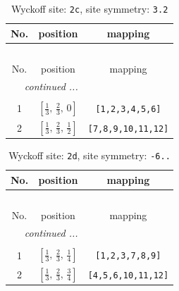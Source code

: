 \documentclass[fleqn,8pt]{jsarticle}
\begin{document}
\begin{longtable}{ccc}
\caption{Wyckoff site: {\tt 2c}, site symmetry: {\tt 3.2}}
 \\
 \hline \hline
No. & position & mapping \\ \hline \endfirsthead

\multicolumn{2}{l}{\tablename\ \thetable{}} \\
 \hline \hline
No. & position & mapping \\ \hline \endhead

 \hline \hline
\multicolumn{2}{r}{\footnotesize\it continued ...} \\ \endfoot

 \hline \hline
\multicolumn{2}{r}{} \\ \endlastfoot

1 & $\left[ \frac{1}{3},\, \frac{2}{3},\, 0 \right]$ & {\tt [1,2,3,4,5,6]} \\ \hline
2 & $\left[ \frac{1}{3},\, \frac{2}{3},\, \frac{1}{2} \right]$ & {\tt [7,8,9,10,11,12]} \\
\end{longtable}
\renewcommand{\arraystretch}{1.2}
\begin{longtable}{ccc}
\caption{Wyckoff site: {\tt 2d}, site symmetry: {\tt -6..}}
 \\
 \hline \hline
No. & position & mapping \\ \hline \endfirsthead

\multicolumn{2}{l}{\tablename\ \thetable{}} \\
 \hline \hline
No. & position & mapping \\ \hline \endhead

 \hline \hline
\multicolumn{2}{r}{\footnotesize\it continued ...} \\ \endfoot

 \hline \hline
\multicolumn{2}{r}{} \\ \endlastfoot

1 & $\left[ \frac{1}{3},\, \frac{2}{3},\, \frac{1}{4} \right]$ & {\tt [1,2,3,7,8,9]} \\ \hline
2 & $\left[ \frac{1}{3},\, \frac{2}{3},\, \frac{3}{4} \right]$ & {\tt [4,5,6,10,11,12]} \\
\end{longtable}
\renewcommand{\arraystretch}{1.2}
\end{document}

